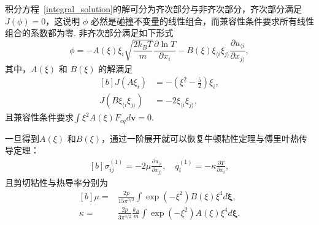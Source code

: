 积分方程~\eqref{integral_solution}的解可分为齐次部分与非齐次部分，齐次部分满足 ${J}(\phi)=0$，这说明 $\phi$ 必然是碰撞不变量的线性组合，而兼容性条件要求所有线性组合的系数都为零. 非齐次部分满足如下形式
\begin{equation}
\phi=-A(\xi)\xi_i\sqrt{\frac{2k_BT}{m}}\frac{\partial \ln{T}}{\partial x_i}
-B(\xi)\xi_{\langle{i}} \xi_{j\rangle}\frac{\partial u_{\langle i}}{\partial x_{j\rangle}},
\end{equation}
其中，$A(\xi)$ 和 $B(\xi)$ 的解满足
\begin{equation}\label{transport_coefficient_0}
\begin{aligned}[b]
{J}(A\xi_i)&=-\left(\xi^2-\frac{5}{2}\right)\xi_i,
\\
{J}(B\xi_{\langle{i}} \xi_{j\rangle})&=-2\xi_{\langle{i}} \xi_{j\rangle},
\end{aligned}
\end{equation}
且兼容性条件要求$\int \xi^2A(\xi)F_{eq}d\bm{v}=0$. 


一旦得到$A(\xi)$ 和$B(\xi)$，通过一阶展开就可以恢复牛顿粘性定理与傅里叶热传导定理：
\begin{equation}\label{NS_constitutive}
\begin{aligned}[b]
\sigma^{(1)}_{ij}=-2\mu\frac{\partial u_{\langle i}}{\partial x_{j\rangle}},\quad
q^{(1)}_i=-\kappa \frac{\partial T}{\partial x_i},
\end{aligned}
\end{equation} 
且剪切粘性与热导率分别为
\begin{equation}\label{viscosity_original}
\begin{aligned}[b]
\mu=&\frac{2p}{15\pi^{3/2}}\int\exp(-\xi^2)B(\xi)\xi^4d\bm{\xi},
\\
\kappa=&\frac{2p}{3\pi^{3/2}}
\frac{k_B}{m}
\int\exp(-\xi^2)A(\xi)\xi^4
d\bm{\xi}.
\end{aligned}
\end{equation}


